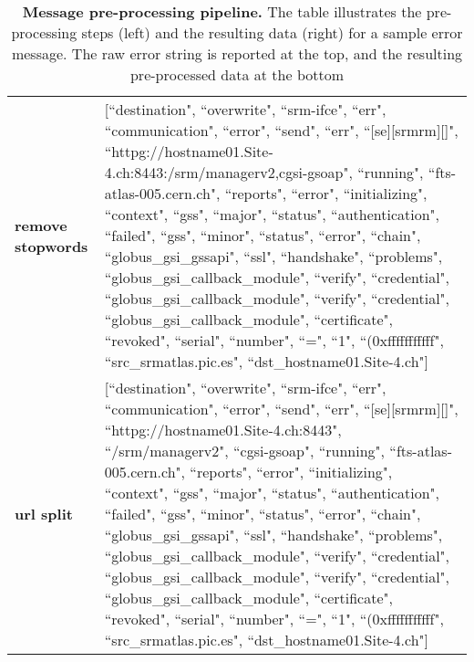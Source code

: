 \begin{table}
\begin{tabular}{p{1.9cm} | p{12cm}}
\textbf{remove stopwords} &
  {[}``destination", ``overwrite", ``srm-ifce", ``err", ``communication", ``error", ``send", ``err", ``{[}se{]}{[}srmrm{]}{[}{]}", ``httpg://hostname01.Site-4.ch:8443:/srm/managerv2,cgsi-gsoap", ``running", ``fts-atlas-005.cern.ch", ``reports", ``error", ``initializing", ``context", ``gss", ``major", ``status", ``authentication", ``failed", ``gss", ``minor", ``status", ``error", ``chain", ``globus\_gsi\_gssapi", ``ssl", ``handshake", ``problems", ``globus\_gsi\_callback\_module", ``verify", ``credential", ``globus\_gsi\_callback\_module", ``verify", ``credential", ``globus\_gsi\_callback\_module", ``certificate", ``revoked", ``serial", ``number", ``=", ``1", ``(0xfffffffffff", ``src\_srmatlas.pic.es", ``dst\_hostname01.Site-4.ch"{]} \\[0.2cm]
\textbf{url split} &
  {[}``destination", ``overwrite", ``srm-ifce", ``err", ``communication", ``error", ``send", ``err", ``{[}se{]}{[}srmrm{]}{[}{]}", ``httpg://hostname01.Site-4.ch:8443", ``/srm/managerv2", ``cgsi-gsoap", ``running", ``fts-atlas-005.cern.ch", ``reports", ``error", ``initializing", ``context", ``gss", ``major", ``status", ``authentication", ``failed", ``gss", ``minor", ``status", ``error", ``chain", ``globus\_gsi\_gssapi", ``ssl", ``handshake", ``problems", ``globus\_gsi\_callback\_module", ``verify", ``credential", ``globus\_gsi\_callback\_module", ``verify", ``credential", ``globus\_gsi\_callback\_module", ``certificate", ``revoked", ``serial", ``number", ``=", ``1", ``(0xfffffffffff", ``src\_srmatlas.pic.es", ``dst\_hostname01.Site-4.ch"{]}
\end{tabular}
\caption{\textbf{Message pre-processing pipeline.} The table illustrates the \mbox{pre-processing} steps (left) and the resulting data (right) for a sample error message. The raw error string is reported at the top, and the resulting pre-processed data at the bottom}
\label{tab:preproc-pipeline}
\end{table}


